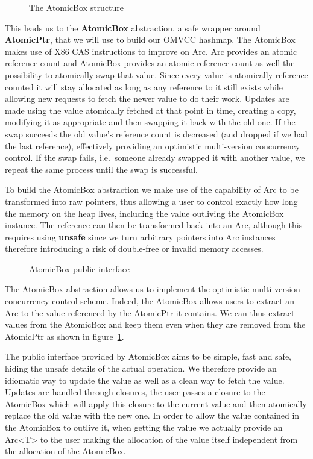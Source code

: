 \begin{figure}[htb!]
  
  \caption{The AtomicBox structure}
\end{figure}

This leads us to the \textbf{AtomicBox} abstraction, a safe wrapper
around \textbf{AtomicPtr}, that we will use to build our OMVCC
hashmap. The AtomicBox makes use of X86 CAS instructions to improve on
Arc. Arc provides an atomic reference count and AtomicBox provides an
atomic reference count as well the possibility to atomically swap that
value. Since every value is atomically reference counted it will stay
allocated as long as any reference to it still exists while allowing
new requests to fetch the newer value to do their work. Updates are
made using the value atomically fetched at that point in time,
creating a copy, modifying it as appropriate and then swapping it back
with the old one. If the swap succeeds the old value's reference count
is decreased (and dropped if we had the last reference), effectively
providing an optimistic multi-version concurrency control. If the swap
fails, i.e.\ someone already swapped it with another value, we repeat
the same process until the swap is successful.

To build the AtomicBox abstraction we make use of the capability of
Arc to be transformed into raw pointers, thus allowing a user to
control exactly how long the memory on the heap lives, including the
value outliving the AtomicBox instance. The reference can then be
transformed back into an Arc, although this requires using
\textbf{unsafe} since we turn arbitrary pointers into Arc instances
therefore introducing a risk of double-free or invalid memory
accesses.

\begin{figure}[htb!]
  \label{code:atomicbox-interface}
  
  \caption{AtomicBox public interface}
\end{figure}

The AtomicBox abstraction allows us to implement the optimistic
multi-version concurrency control scheme. Indeed, the AtomicBox allows
users to extract an Arc to the value referenced by the AtomicPtr it
contains. We can thus extract values from the AtomicBox and keep them
even when they are removed from the AtomicPtr as shown in
figure~\ref{code:atomicbox-interface}.

The public interface provided by AtomicBox aims to be simple, fast and
safe, hiding the unsafe details of the actual operation. We therefore
provide an idiomatic way to update the value as well as a clean way to
fetch the value. Updates are handled through closures, the user passes
a closure to the AtomicBox which will apply this closure to the
current value and then atomically replace the old value with the new
one. In order to allow the value contained in the AtomicBox to outlive
it, when getting the value we actually provide an Arc<T> to the user
making the allocation of the value itself independent from the
allocation of the AtomicBox.


